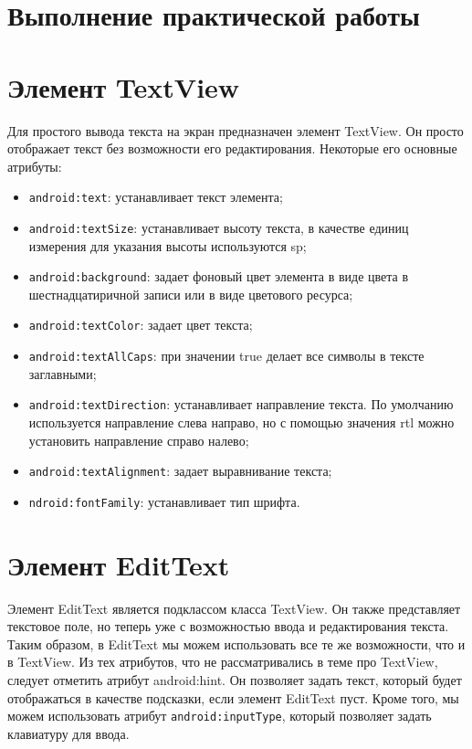 \clearpage

\section*{\LARGE{Выполнение практической работы}}

\section{Элемент TextView}
Для простого вывода текста на экран предназначен элемент TextView. 
Он просто отображает текст без возможности его редактирования. 
Некоторые его основные атрибуты:

\begin{itemize}
	\item \texttt{android:text}: устанавливает текст элемента;
	\item \texttt{android:textSize}: устанавливает высоту текста,
		в качестве единиц измерения для указания высоты используются sp;
	\item \texttt{android:background}: задает фоновый цвет элемента в виде
		цвета в шестнадцатиричной записи или в виде цветового ресурса;
	\item \texttt{android:textColor}: задает цвет текста;
	\item \texttt{android:textAllCaps}: при значении true делает все символы
		в тексте заглавными;
	\item \texttt{android:textDirection}: устанавливает направление текста.
		По умолчанию используется направление слева направо, но с помощью
		значения rtl можно установить направление справо налево;
	\item \texttt{android:textAlignment}: задает выравнивание текста;
	\item \texttt{ndroid:fontFamily}: устанавливает тип шрифта.
\end{itemize}

\section{Элемент EditText}
Элемент EditText является подклассом класса TextView. Он также 
представляет текстовое поле, но теперь уже с возможностью ввода и 
редактирования текста. Таким образом, в EditText мы можем использовать 
все те же возможности, что и в TextView. Из тех атрибутов, что не 
рассматривались в теме про TextView, следует отметить атрибут android:hint. 
Он позволяет задать текст, который будет отображаться в качестве 
подсказки, если элемент EditText пуст. Кроме того, мы можем использовать 
атрибут \texttt{android:inputType}, который позволяет задать
клавиатуру для ввода.

